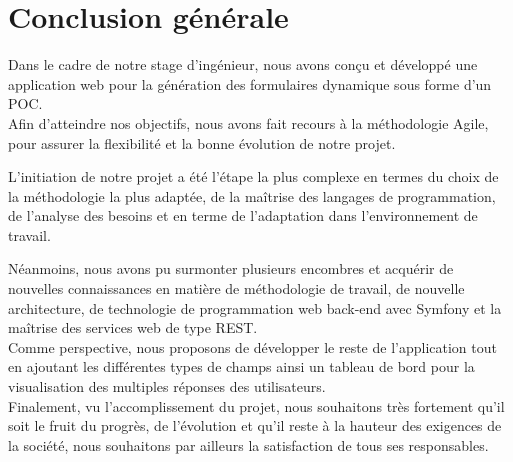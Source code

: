\chapter*{Conclusion générale}

Dans le cadre de notre stage d'ingénieur, nous avons conçu et développé une application web pour la génération des formulaires dynamique sous forme d'un POC.\\

Afin d’atteindre nos objectifs, nous avons fait recours à la méthodologie Agile, pour assurer
la flexibilité et la bonne évolution de notre projet.

L’initiation de notre projet a été l’étape la plus complexe en termes du choix de la méthodologie la plus adaptée, de la maîtrise des langages de programmation, de l’analyse des
besoins et en terme de l’adaptation dans l’environnement de travail.

Néanmoins, nous avons pu surmonter plusieurs encombres et acquérir de nouvelles connaissances
en matière de méthodologie de travail, de nouvelle architecture, de technologie de
programmation web back-end avec Symfony et la maîtrise des services web de type REST.\\

Comme perspective, nous proposons de développer le reste de l'application tout en ajoutant les différentes types de champs ainsi un tableau de bord pour la visualisation des multiples réponses des utilisateurs.\\
Finalement, vu l’accomplissement du projet, nous souhaitons très fortement qu’il soit le fruit
du progrès, de l’évolution et qu’il reste à la hauteur des exigences de la société, nous souhaitons par ailleurs la satisfaction  de tous ses responsables.

